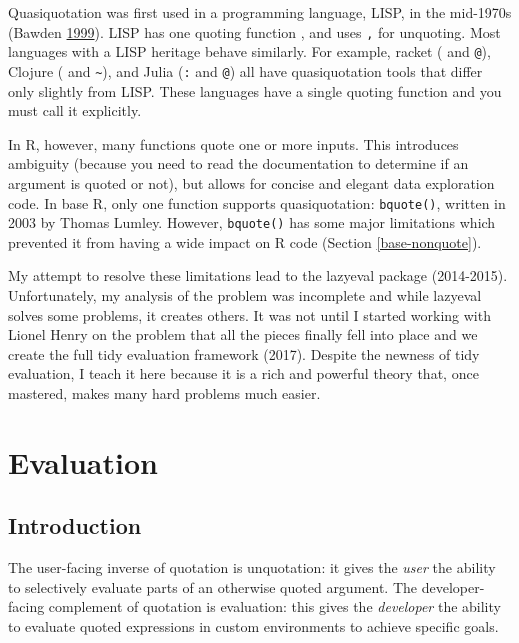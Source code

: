 \documentclass[]{book}
\begin{document}
Quasiquotation was first used in a programming language, LISP, in the mid-1970s (Bawden \protect\hyperlink{ref-bawden-1999}{1999}). LISP has one quoting function \texttt{\textasciigrave{}}, and uses \texttt{,} for unquoting. Most languages with a LISP heritage behave similarly. For example, racket (\texttt{\textasciigrave{}} and \texttt{@}), Clojure (\texttt{\textasciigrave{}} and \texttt{\textasciitilde{}}), and Julia (\texttt{:} and \texttt{@}) all have quasiquotation tools that differ only slightly from LISP. These languages have a single quoting function and you must call it explicitly.

In R, however, many functions quote one or more inputs. This introduces ambiguity (because you need to read the documentation to determine if an argument is quoted or not), but allows for concise and elegant data exploration code. In base R, only one function supports quasiquotation: \texttt{bquote()}, written in 2003 by Thomas Lumley. However, \texttt{bquote()} has some major limitations which prevented it from having a wide impact on R code (Section \ref{base-nonquote}).

My attempt to resolve these limitations lead to the lazyeval package (2014-2015). Unfortunately, my analysis of the problem was incomplete and while lazyeval solves some problems, it creates others. It was not until I started working with Lionel Henry on the problem that all the pieces finally fell into place and we create the full tidy evaluation framework (2017). Despite the newness of tidy evaluation, I teach it here because it is a rich and powerful theory that, once mastered, makes many hard problems much easier.

\hypertarget{evaluation}{%
\chapter{Evaluation}\label{evaluation}}

\hypertarget{introduction-3}{%
\section{Introduction}\label{introduction-3}}

The user-facing inverse of quotation is unquotation: it gives the \emph{user} the ability to selectively evaluate parts of an otherwise quoted argument. The developer-facing complement of quotation is evaluation: this gives the \emph{developer} the ability to evaluate quoted expressions in custom environments to achieve specific goals.
\end{document}
